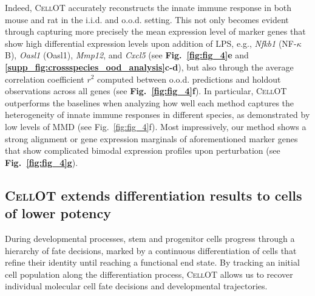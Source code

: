 Indeed, \textsc{CellOT} accurately reconstructs the innate immune response in both mouse and rat in the i.i.d. and o.o.d. setting. This not only becomes evident through capturing more precisely the mean expression level of marker genes that show high differential expression levels upon addition of LPS, e.g., \textit{Nfkb1} (NF-$\kappa$B), \textit{Oasl1} (Oasl1), \textit{Mmp12}, and \textit{Cxcl5} (see \textbf{Fig.~\ref{fig:fig_4}e} and \textbf{\ref{supp_fig:crossspecies_ood_analysis}c-d}), but also through the average correlation coefficient $r^2$ computed between o.o.d. predictions and holdout observations across all genes (see \textbf{Fig.~\ref{fig:fig_4}f}).
In particular, \textsc{CellOT} outperforms the baselines when analyzing how well each method captures the heterogeneity of innate immune responses in different species, as demonstrated by low levels of MMD (see Fig.~\ref{fig:fig_4}f).
Most impressively, our method shows a strong alignment or gene expression marginals of aforementioned marker genes that show complicated bimodal expression profiles upon perturbation (see \textbf{Fig.~\ref{fig:fig_4}g}).

\subsection{\textsc{CellOT} extends differentiation results to cells of lower potency}

During developmental processes, stem and progenitor cells progress through a hierarchy of fate decisions, marked by a continuous differentiation of cells that refine their identity until reaching a functional end state.
By tracking an initial cell population along the differentiation process, \textsc{CellOT} allows us to recover individual molecular cell fate decisions and developmental trajectories. 

